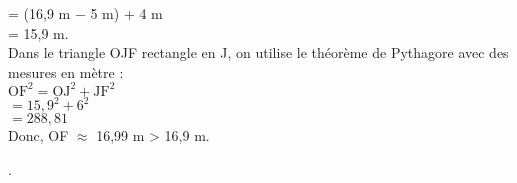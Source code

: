 \begin{enumerate}
\begin{minipage}{8cm}
      \hspace*{1.35cm} = (16,9 m $-$ 5 m) + 4 m \\
      \hspace*{1.35cm} = 15,9 m. \\ [3mm]
      Dans le triangle OJF rectangle en J, on utilise le théorème de Pythagore avec des mesures en mètre : \\
      $\text{OF}^2 = \text{OJ}^2 + \text{JF}^2$ \\
      \hspace*{0.65cm}  $= 15,9^2 + 6^2$ \\
      \hspace*{0.65cm}  $= 288,81$ \\
      Donc, OF $\approx$ 16,99 m > 16,9 m.
   \end{minipage}
   .
\end{enumerate}
